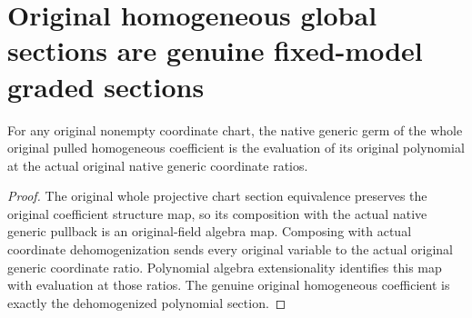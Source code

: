 \section{Original homogeneous global sections are genuine fixed-model graded sections}
\label{sec:projective-native-homogeneous-model-sections}

\begin{theorem}
\label{thm:projective-native-homogeneous-coefficient}
\leanok
{}
For any original nonempty coordinate chart, the native generic germ of the
whole original pulled homogeneous coefficient is the evaluation of its
original polynomial at the actual original native generic coordinate ratios.
\end{theorem}
\begin{proof}
The original whole projective chart section equivalence preserves the
original coefficient structure map, so its composition with the actual
native generic pullback is an original-field algebra map. Composing with
actual coordinate dehomogenization sends every original variable to the
actual original generic coordinate ratio. Polynomial algebra extensionality
identifies this map with evaluation at those ratios. The genuine original
homogeneous coefficient is exactly the dehomogenized polynomial section.
\end{proof}

